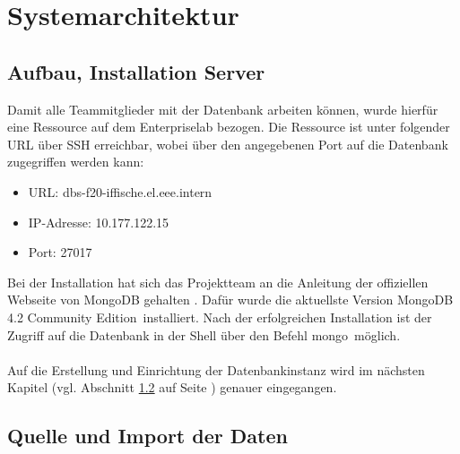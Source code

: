 \documentclass[12pt,titlepage]{article}
\begin{document}
\section{Systemarchitektur}
\subsection{Aufbau, Installation Server}
Damit alle Teammitglieder mit der Datenbank arbeiten können, wurde hierfür eine Ressource auf dem Enterpriselab bezogen. Die Ressource ist unter folgender URL über SSH erreichbar, wobei über den angegebenen Port auf die Datenbank zugegriffen werden kann: 
\begin{itemize}
\item URL: dbs-f20-iffische.el.eee.intern
\item IP-Adresse: 10.177.122.15
\item Port: 27017
\end{itemize}

Bei der Installation hat sich das Projektteam an die Anleitung der offiziellen Webseite von MongoDB gehalten . Dafür wurde die aktuellste Version \glqq MongoDB 4.2 Community Edition\grqq\, installiert. Nach der erfolgreichen Installation ist der Zugriff auf die Datenbank in der Shell über den Befehl \glqq mongo\grqq\, möglich.\\
\\
Auf die Erstellung und Einrichtung der Datenbankinstanz wird im nächsten Kapitel (vgl. Abschnitt \ref{Quelle und Import} auf Seite \pageref{Quelle und Import}) genauer eingegangen.

\subsection{Quelle und Import der Daten}\label{Quelle und Import}
\end{document}
